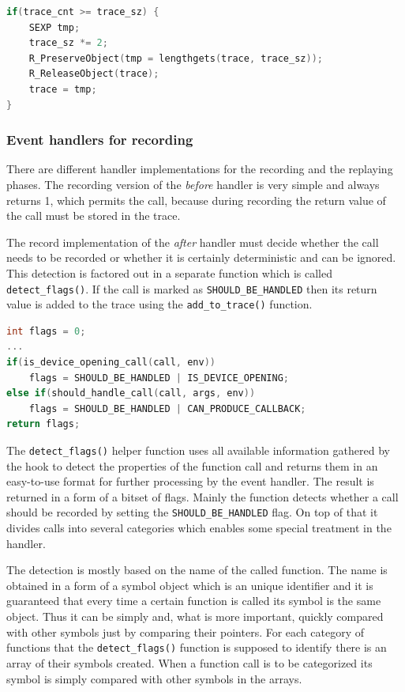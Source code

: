 \documentclass[thesis=M,english,hidelinks]{FITthesis}[2012/10/20]
\begin{document}
\begin{lstlisting}[style=filestyle, language=C, caption={Trace resizing in the \lstinline|add_to_trace()| function}, float, floatplacement=H]
if(trace_cnt >= trace_sz) {
	SEXP tmp;
	trace_sz *= 2;
	R_PreserveObject(tmp = lengthgets(trace, trace_sz));
	R_ReleaseObject(trace);
	trace = tmp;
}
\end{lstlisting}
			
			\subsubsection{Event handlers for recording}
			There are different handler implementations for the recording and the replaying phases. The recording version of the \emph{before} handler is very simple and always returns 1, which permits the call, because during recording the return value of the call must be stored in the trace.\par
			
			The record implementation of the \emph{after} handler must decide whether the call needs to be recorded or whether it is certainly deterministic and can be ignored. This detection is factored out in a separate function which is called \lstinline|detect_flags()|. If the call is marked as \lstinline|SHOULD_BE_HANDLED| then its return value is added to the trace using the \lstinline|add_to_trace()| function.\par
			
\begin{lstlisting}[style=filestyle, language=C, caption={Excerpt from the \lstinline|detect_flags()| function}]
int flags = 0;
...
if(is_device_opening_call(call, env))
	flags = SHOULD_BE_HANDLED | IS_DEVICE_OPENING;
else if(should_handle_call(call, args, env))
	flags = SHOULD_BE_HANDLED | CAN_PRODUCE_CALLBACK;
return flags;
\end{lstlisting}
			
			The \lstinline|detect_flags()| helper function uses all available information gathered by the hook to detect the properties of the function call and returns them in an easy-to-use format for further processing by the event handler. The result is returned in a form of a bitset of flags. Mainly the function detects whether a call should be recorded by setting the \lstinline|SHOULD_BE_HANDLED| flag. On top of that it divides calls into several categories which enables some special treatment in the handler.\par
			
			The detection is mostly based on the name of the called function. The name is obtained in a form of a symbol object which is an unique identifier and it is guaranteed that every time a certain function is called its symbol is the same object. Thus it can be simply and, what is more important, quickly compared with other symbols just by comparing their pointers. For each category of functions that the \lstinline|detect_flags()| function is supposed to identify there is an array of their symbols created. When a function call is to be categorized its symbol is simply compared with other symbols in the arrays.\par
			
\end{document}
